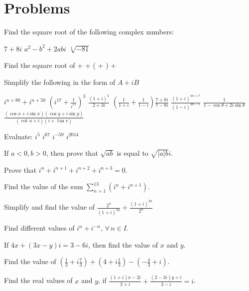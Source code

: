 \section{Problems}
Find the square root of the following complex numbers:


\startitem $7 + 8i$\stopitem
\startitem $a^2 - b^2 + 2abi$\stopitem
\startitem $\sqrt[4]{-81}$\stopitem
\stopitemize
{}
\item Find the square root of \startformula {} +  + \left( + \right) +
  \stopformula
\stopitemize

\noindent Simplify the following in the form of $A + iB$

\startitem $i^{n + 80} + i^{n + 50}$\stopitem
\startitem $\left(i^{17} + \frac{1}{i^{15}}\right)^3$\stopitem
\startitem $\frac{(1 + i)^2}{2 + 3i}$\stopitem
\startitem $\left(\frac{1}{1 + i} + \frac{1}{1 - i}\right)\frac{7 + 8i}{7 - 8i}$\stopitem
\startitem $\frac{(1 + i)^{4n + 7}}{(1 - i)^{4n - 1}}$\stopitem
\startitem $\frac{1}{1 - \cos\theta + 2i\sin\theta}$\stopitem
\startitem $\frac{(\cos x + i\sin x)(\cos y + i\sin y)}{(\cot u + i)(i + \tan v)}$\stopitem
\stopitemize
{}
\item Evaluate:
  \startitem $i^5$\stopitem
  \startitem $i^{67}$\stopitem
  \startitem $i^{-59}$\stopitem
  \startitem $i^{2014}$\stopitem
  \stopitemize
\item If $a<0, b>0$, then prove that $\sqrt{ab}$ is equal to $\sqrt{|a|b}i$.
\item Prove that $i^n + i^{n + 1} + i^{n + 2} + i^{n + 3} = 0$.
\item Find the value of the sum $\displaystyle\sum_{n = 1}^{13}(i^n + i^{n + 1})$.
\item Simplify and find the value of $\frac{2^n}{(1 + i)^{2n}} + \frac{(1 + i)^{2n}}{2^n}$
\item Find different values of $i^n + i^{-n}, \,\forall\,n\in I$.
\item If $4x + (3x - y)i = 3 - 6i$, then find the value of $x$ and $y$.
\item Find the value of $\left(\frac{1}{3} + i\frac{7}{3}\right) + \left(4 + i\frac{1}{3}\right) - \left(-\frac{4}{3} + i\right)$.
\item Find the real values of $x$ and $y$, if $\frac{(1 + i)x - 2i}{3 + i} + \frac{(2 - 3i)y + i}{3 - i} = i$.
